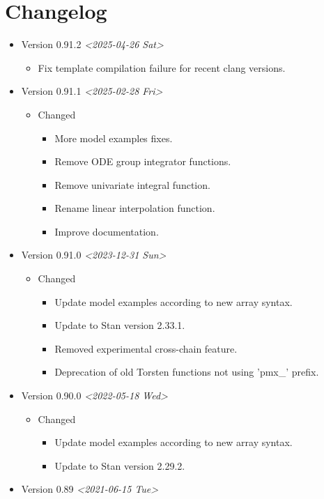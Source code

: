 \documentclass[12pt, reqno, oneside]{amsbook}
\numberwithin{equation}{chapter}
\numberwithin{figure}{chapter}
\numberwithin{table}{chapter}
\theoremstyle{remark}
\begin{document}
\chapter{Changelog}
\label{sec:org6ee814c}
\begin{itemize}
  \item Version 0.91.2 \textit{<2025-04-26 Sat>}
\begin{itemize}
\item Fix template compilation failure for recent clang versions.
\end{itemize}
  \item Version 0.91.1 \textit{<2025-02-28 Fri>}
\begin{itemize}
\item Changed
\begin{itemize}
\item More model examples fixes.
\item Remove ODE group integrator functions.
\item Remove univariate integral function.
\item Rename linear interpolation function.
\item Improve documentation.
\end{itemize}
\end{itemize}
\item Version 0.91.0 \textit{<2023-12-31 Sun>}
\begin{itemize}
\item Changed
\begin{itemize}
\item Update model examples according to new array syntax.
\item Update to Stan version 2.33.1.
\item Removed experimental cross-chain feature.
\item Deprecation of old Torsten functions not using 'pmx\_' prefix.
\end{itemize}
\end{itemize}
\item Version 0.90.0 \textit{<2022-05-18 Wed>}
\begin{itemize}
\item Changed
\begin{itemize}
\item Update model examples according to new array syntax.
\item Update to Stan version 2.29.2.
\end{itemize}
\end{itemize}
\item Version 0.89 \textit{<2021-06-15 Tue>}

\end{itemize}
\end{document}
